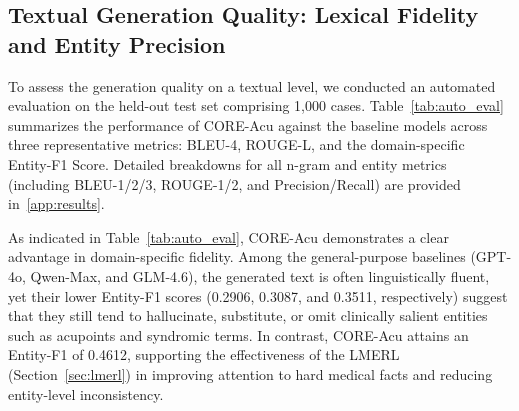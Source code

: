 \documentclass[preprint,5p,times,twocolumn,fleqn]{elsarticle}
\begin{document}
\subsection{Textual Generation Quality: Lexical Fidelity and Entity Precision}
\label{sec:exp_surface}
To assess the generation quality on a textual level, we conducted an automated evaluation on the held-out test set comprising 1{,}000 cases. Table~\ref{tab:auto_eval} summarizes the performance of CORE-Acu against the baseline models across three representative metrics: BLEU-4, ROUGE-L, and the domain-specific Entity-F1 Score. Detailed breakdowns for all n-gram and entity metrics (including BLEU-1/2/3, ROUGE-1/2, and Precision/Recall) are provided in~\ref{app:results}.

\begin{table}[htbp]
\centering
\caption{\textbf{Automated Evaluation Results on the Held-out Test Set.} CORE-Acu achieves the best performance among the evaluated baselines across all metrics. Note: \textit{Entity-F1} measures the strict overlap of key medical entities (Acupoints, Syndromes) against the ground truth.}
\label{tab:auto_eval}
\renewcommand{\arraystretch}{1.15}
\setlength{\tabcolsep}{4pt}

\end{table}

As indicated in Table~\ref{tab:auto_eval}, CORE-Acu demonstrates a clear advantage in domain-specific fidelity. Among the general-purpose baselines (GPT-4o, Qwen-Max, and GLM-4.6), the generated text is often linguistically fluent, yet their lower Entity-F1 scores (0.2906, 0.3087, and 0.3511, respectively) suggest that they still tend to hallucinate, substitute, or omit clinically salient entities such as acupoints and syndromic terms. In contrast, CORE-Acu attains an Entity-F1 of 0.4612, supporting the effectiveness of the LMERL (Section~\ref{sec:lmerl}) in improving attention to hard medical facts and reducing entity-level inconsistency.
\end{document}
